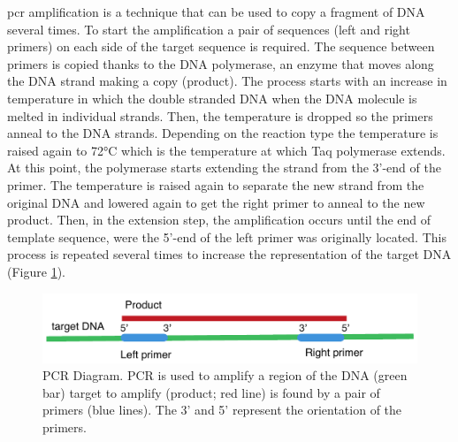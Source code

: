 \Gls{pcr} amplification is a technique that can be used to copy a fragment of DNA several times. 
To start the amplification a pair of sequences (left and right primers) on each side of the target sequence is required. 
The sequence between primers is copied thanks to the DNA polymerase, an enzyme that moves along the DNA strand making a copy (product). 
The process starts with an increase in temperature in which the double stranded DNA when the DNA molecule is melted in individual strands. 
Then, the temperature is dropped so the primers anneal to the DNA strands. 
Depending on the reaction type the temperature is raised again to 72°C which is the temperature at which Taq polymerase extends. 
At this point, the polymerase starts extending the strand from the 3'-end of the primer. 
The temperature is raised again to separate the new strand from the original DNA and lowered again to get the right primer to anneal to the new product.
Then, in the extension step, the amplification occurs until the end of template sequence, were the 5'-end of the left primer was originally located. 
This process is repeated several times to increase the representation of the target DNA (Figure \ref{fig:poly:amplificationProduct}).  

\begin{figure}
\includegraphics[width=1\textwidth]{PolyMarker/Figures/intro/amplificationProduct.pdf}
\caption[PCR Diagram]{PCR Diagram. PCR is used to amplify a region of the DNA (green bar) target to amplify (product; red line) is found by a pair of primers (blue lines). The 3' and 5' represent the orientation of the primers.}
\label{fig:poly:amplificationProduct}
\end{figure}

